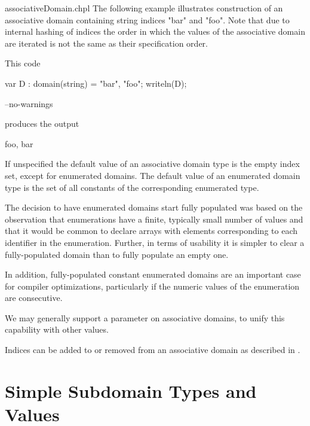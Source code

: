 \begin{chapelexample}{associativeDomain.chpl}
The following example illustrates construction of an associative domain
containing string indices "bar" and "foo".  Note that due to internal hashing 
of indices the order in which the values of the associative domain are iterated
is not the same as their specification order.

This code
\begin{chapel}
var D : domain(string) = {"bar", "foo"};
writeln(D);
\end{chapel}
\begin{chapelcompopts}
--no-warnings
\end{chapelcompopts}
produces the output
\begin{chapelprintoutput}{}
{foo, bar}
\end{chapelprintoutput}
\end{chapelexample}


If unspecified the default value of an associative domain type is the empty 
index set, except for enumerated domains.
The default value of an enumerated domain type is the set of all constants
of the corresponding enumerated type.

\begin{rationale}
The decision to have enumerated domains start fully populated was
based on the observation that enumerations have a finite, typically
small number of values and that it would be common to declare arrays
with elements corresponding to each identifier in the enumeration.
Further, in terms of usability it is simpler to clear a fully-populated
domain than to fully populate an empty one.

In addition, fully-populated constant enumerated
domains are an important case for compiler optimizations, particularly
if the numeric values of the enumeration are consecutive.
\end{rationale}

\begin{future}
We may generally support a  parameter on associative
domains, to unify this capability with other values.
\end{future}

Indices can be added to or removed from an associative domain
as described in .


\section{Simple Subdomain Types and Values}
\label{Simple_Subdomain_Types_and_Values}

